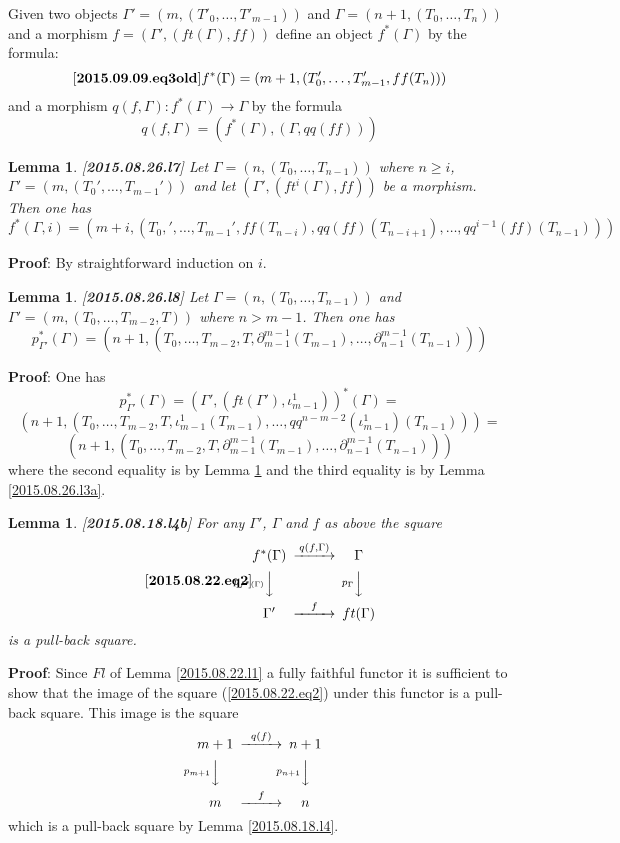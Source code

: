 \documentclass[11pt]{article}
\newenvironment{eq}{\begin{equation}}{\end{equation}}
\newenvironment{proof}{{\bf Proof}:}{\vskip 5mm }
\newtheorem{lemma}[proposition]{Lemma}
\newcommand{\llabel}[1]{\label{#1}[{\bf #1}]}
\newcommand{\sr}{\rightarrow}
\begin{document}
Given two objects $\Gamma'=(m,(T'_0,\dots,T'_{m-1}))$ and $\Gamma=(n+1,(T_0,\dots,T_{n}))$ and a morphism $f=(\Gamma',(ft(\Gamma),ff))$
define an object $f^*(\Gamma)$ by the formula:
%
\begin{eq}\llabel{2015.09.09.eq3old}
f^*(\Gamma)=(m+1,(T'_0,\dots,T'_{m-1},ff(T_{n})))
\end{eq}
%
and a morphism $q(f,\Gamma):f^*(\Gamma)\sr \Gamma$ by the formula
%
$$q(f,\Gamma)=(f^*(\Gamma),(\Gamma, qq(ff)))$$
% 
\begin{lemma}
\llabel{2015.08.26.l7}
Let $\Gamma=(n,(T_0,\dots,T_{n-1}))$ where $n\ge i$, $\Gamma'=(m,(T_0',\dots,T_{m-1}'))$ and let $(\Gamma',(ft^i(\Gamma),ff))$ be a morphism.
Then one has
%
$$f^*(\Gamma,i)=(m+i,(T_0,',\dots,T_{m-1}',ff(T_{n-i}),qq(ff)(T_{n-i+1}) ,\dots,qq^{i-1}(ff)(T_{n-1})))$$
%
\end{lemma}
%
\begin{proof}
By straightforward induction on $i$.
\end{proof}
%
\begin{lemma}
\llabel{2015.08.26.l8}
Let $\Gamma=(n,(T_0,\dots,T_{n-1}))$ and $\Gamma'=(m,(T_0,\dots,T_{m-2},T))$ where $n>m-1$. Then one has
%
$$p_{\Gamma'}^*(\Gamma)=(n+1,(T_0,\dots,T_{m-2},T,\partial_{m-1}^{m-1}(T_{m-1}),\dots,\partial_{n-1}^{m-1}(T_{n-1})))$$
%
\end{lemma}
%
\begin{proof}
One has
%
$$p_{\Gamma'}^*(\Gamma)=(\Gamma',(ft(\Gamma'),\iota_{m-1}^1))^*(\Gamma)=$$$$(n+1,(T_0,\dots,T_{m-2},T,\iota_{m-1}^1(T_{m-1}),\dots,qq^{n-m-2}(\iota_{m-1}^1)(T_{n-1})))=$$
$$(n+1,(T_0,\dots,T_{m-2},T,\partial_{m-1}^{m-1}(T_{m-1}),\dots,\partial^{m-1}_{n-1}(T_{n-1})))$$
%
where the second equality is by Lemma \ref{2015.08.26.l7} and the third equality is by Lemma \ref{2015.08.26.l3a}.
\end{proof}
%
\begin{lemma}
\llabel{2015.08.18.l4b}
For any $\Gamma'$, $\Gamma$ and $f$ as above the square
%
\begin{eq}\llabel{2015.08.22.eq2}
\begin{CD}
f^*(\Gamma) @>q(f,\Gamma)>> \Gamma\\
@Vp_{f^*(\Gamma)}VV @Vp_{\Gamma}VV\\
\Gamma' @>f>> ft(\Gamma)
\end{CD}
\end{eq}
%
is a pull-back square.
\end{lemma}
%
\begin{proof}
Since $Fl$ of Lemma \ref{2015.08.22.l1} a fully faithful functor it is sufficient to show that the image of the square (\ref{2015.08.22.eq2}) under this functor is a pull-back square. This image is the square
%
$$
\begin{CD}
m+1 @>q(f)>> n+1\\
@Vp_{m+1}VV @Vp_{n+1}VV\\
m @>f>> n
\end{CD}
$$
%
which is a pull-back square by Lemma \ref{2015.08.18.l4}.
\end{proof}
\end{document}
